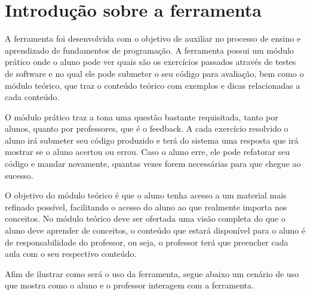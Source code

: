 \documentclass[pnumabnt,normaltoc,espacoumemeio,capchap]{abnt}
\begin{document}
\section{Introdução sobre a ferramenta}
\par A ferramenta foi desenvolvida com o objetivo de auxiliar no processo de ensino e aprendizado de fundamentos de programação. A ferramenta possui um módulo prático onde o aluno pode ver quais são os exercícios passados através de testes de software e no qual ele pode submeter o seu código para avaliação, bem  como o módulo teórico, que traz o conteúdo teórico com exemplos e dicas relacionadas a cada conteúdo. 
\par O módulo prático traz a tona uma questão bastante requisitada, tanto por alunos, quanto por professores, que é o feedback. A cada exercício resolvido o aluno irá submeter seu código produzido e terá do sistema uma resposta que irá mostrar se o aluno acertou ou errou. Caso o aluno erre, ele pode refatorar seu código e mandar novamente, quantas vezes forem necessárias para que chegue ao sucesso.
\par O objetivo do módulo teórico é que o aluno tenha acesso a um material mais refinado possível, facilitando o acesso do aluno ao que realmente importa nos conceitos.  No módulo teórico deve ser ofertada uma visão completa do que o aluno deve aprender de conceitos, o conteúdo que estará disponível para o aluno é de responsabilidade do professor, ou seja, o professor terá que preencher cada aula com o seu respectivo conteúdo.
\par Afim de ilustrar como será o uso da ferramenta, segue abaixo um cenário de uso que mostra como o aluno e o professor interagem com a ferramenta.
\end{document}
